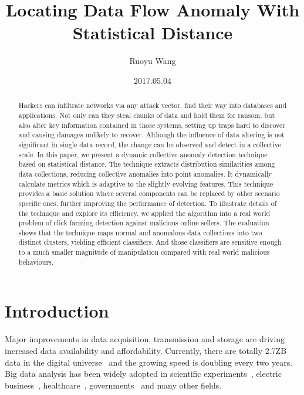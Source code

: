 \documentclass[a4paper]{IEEEtran}
\title{Locating Data Flow Anomaly With Statistical Distance}
\author{Ruoyu Wang}
\date{2017.05.04}
\begin{document}
	\maketitle
	
	\begin{abstract}
		Hackers can infiltrate networks via any attack vector, find their way into databases and applications. Not only can they steal chunks of data and hold them for ransom, but also alter key information contained in those systems, setting up traps hard to discover and causing damages unlikely to recover. Although the influence of data altering is not significant in single data record, the change can be observed and detect in a collective scale.
		In this paper, we present a dynamic collective anomaly detection technique based on statistical distance. The technique extracts distribution similarities among data collections, reducing collective anomalies into point anomalies. It dynamically calculate metrics which is adaptive to the slightly evolving features. This technique provides a basic solution where several components can be replaced by other scenario specific ones, further improving the performance of detection.
		To illustrate details of the technique and explore its efficiency, we applied the algorithm into a real world problem of click farming detection against malicious online sellers. The evaluation shows that the technique maps normal and anomalous data collections into two distinct clusters, yielding efficient classifiers. And those classifiers are sensitive enough to a much smaller magnitude of manipulation compared with real world malicious behaviours.
	\end{abstract}
	
	\section{Introduction}
		Major improvements in data acquisition, transmission and storage are driving increased data availability and affordability. Currently, there are totally 2.7ZB data in the digital universe~\autocite{bigDataStatistics} and the growing speed is doubling every two years.
		Big data analysis has been widely adopted in scientific experiments~\autocite{nothaft2015rethinking}, electric business~\autocite{bronson2015open,sumbaly2013big,chen2016realtime}, healthcare~\autocite{groves2016big}, governments~\autocite{kim2014big} and many other fields.
		
\end{document}
